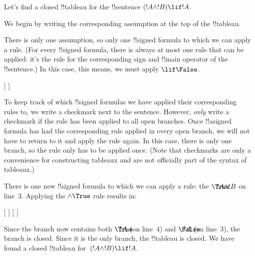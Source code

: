 \documentclass[../../../include/open-logic-section]{subfiles}
\begin{document}
      {}
      {}


\begin{ex}
Let's find a closed !!{tableau} for the !!{sentence} $(!A \land !B) \lif !A$.

We begin by writing the corresponding assumption at the top of the
!!{tableau}.
\begin{oltableau}
  [\sFmla{\False}{(\formula{A} \land \formula{B}) \lif \formula{A}},
    just = \TAss]
\end{oltableau}

There is only one assumption, so only one !!{signed formula} to which
we can apply a rule. (For every !!{signed formula}, there is always at
most one rule that can be applied: it's the rule for the corresponding
sign and !!{main operator} of the !!{sentence}.) In this case, this
means, we must apply $\TRule{\False}{\lif}$.
\begin{oltableau}
  [\sFmla{\False}{(\formula{A} \land \formula{B}) \lif \formula{A}},
    checked, just = \TAss
    [\sFmla{\True}{\formula{A} \land \formula{B}},
      just={\TRule{\False}{\lif}[1]}
      [\sFmla{\False}{\formula{A}}, just={\TRule{\False}{\lif}[1]}]
    ]
  ]
\end{oltableau}
To keep track of which !!{signed formula}s we have applied their
corresponding rules to, we write a checkmark next to the
sentence. However, \emph{only} write a checkmark if the rule has been
applied to all open branches. Once !!a{signed formula} has had the
corresponding rule applied in every open branch, we will not have to
return to it and apply the rule again. In this case, there is only one
branch, so the rule only has to be applied once. (Note that checkmarks
are only a convenience for constructing tableaux and are not
officially part of the syntax of tableaux.)

There is one new !!{signed formula} to which we can apply a rule: the
$\sFmla{\True}{!A \land !B}$ on line~$3$. Applying the
$\TRule{\True}{\land}$ rule results in:
\begin{oltableau}
  [\sFmla{\False}{(\formula{A} \land \formula{B}) \lif \formula{A}},
    checked, just = \TAss
    [\sFmla{\True}{\formula{A} \land \formula{B}},
      just={\TRule{\False}{\lif}[1]}, checked
      [\sFmla{\False}{\formula{A}}, just={\TRule{\False}{\lif}[1]}
        [\sFmla{\True}{\formula{A}}, just={\TRule{\True}{\land}[2]}
          [\sFmla{\True}{\formula{B}}, just={\TRule{\True}{\land}[2]}, close
          ]
        ]
      ]
    ]
  ]
\end{oltableau}
Since the branch now contains both $\sFmla{\True}{!A}$ (on line~$4$)
and $\sFmla{\False}{!A}$ (on line~$3$), the branch is closed. Since it
is the only branch, the !!{tableau} is closed. We have found
a closed !!{tableau} for~$(!A \land !B) \lif !A$.
\end{ex}
\end{document}
